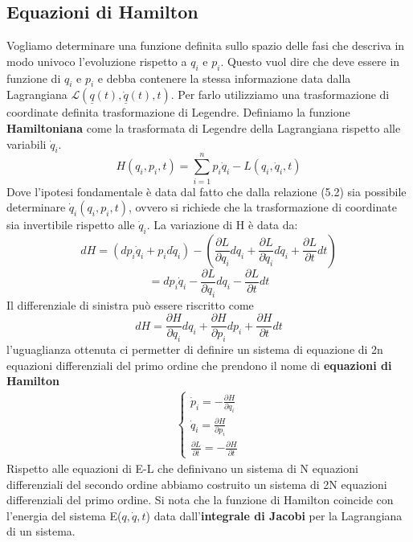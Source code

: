 \subsection{Equazioni di Hamilton}
Vogliamo determinare una funzione definita sullo spazio delle fasi che descriva in modo univoco l'evoluzione rispetto a $q_i$ e $p_i$. Questo vuol dire che deve essere in funzione di $q_i$ e $p_i$ e debba contenere la stessa informazione data dalla Lagrangiana $\mathcal{L}(\underline{q}(t),\underline{\dot q}(t),t)$. Per farlo utilizziamo una trasformazione di coordinate definita trasformazione di Legendre.
Definiamo la funzione \textbf{Hamiltoniana} come la trasformata di Legendre della Lagrangiana rispetto alle variabili $\dot q_i$.
\begin{equation}
	H\left(q_i, p_i, t\right)=\sum_{i=1}^n p_i \dot{q}_i-L\left(q_i, \dot{q}_i, t\right)
\end{equation}
Dove l'ipotesi fondamentale \`{e} data dal fatto che dalla relazione (5.2) sia possibile determinare $\dot q_i(q_i,p_i,t)$, ovvero si richiede che la trasformazione di coordinate sia invertibile rispetto alle $\dot q_i$.\newline
La variazione di H \`{e} data da:
\begin{equation}
	d H=\left(d p_i \dot{q}_i+p_i d \dot{q}_i\right)-\left(\frac{\partial L}{\partial q_i} d q_i+\frac{\partial L}{\partial \dot{q}_i} d \dot{q}_i+\frac{\partial L}{\partial t} d t\right)
\end{equation}
\begin{equation*}
	=d p_i \dot{q}_i-\frac{\partial L}{\partial q_i} d q_i-\frac{\partial L}{\partial t} d t
\end{equation*}
Il differenziale di sinistra pu\`{o} essere riscritto come
\begin{equation}
	d H=\frac{\partial H}{\partial q_i} d q_i+\frac{\partial H}{\partial p_i} d p_i+\frac{\partial H}{\partial t} d t
\end{equation}
l'uguaglianza ottenuta ci permetter di definire un sistema di equazione di 2n equazioni differenziali del primo ordine che prendono il nome di \textbf{equazioni di Hamilton}
\begin{align}
	\begin{cases}
	\dot{p}_i  =-\frac{\partial H}{\partial q_i} \\
	\dot{q}_i  =\frac{\partial H}{\partial p_i} \\
	\frac{\partial L}{\partial t} = -\frac{\partial H}{\partial t}
	\end{cases}	
\end{align}	
Rispetto alle equazioni di E-L che definivano un sistema di N equazioni differenziali del secondo ordine
abbiamo costruito un sistema di 2N equazioni differenziali del primo ordine.\newline
Si nota che la funzione di Hamilton coincide con l'energia del sistema E($q,\dot q, t$) data dall'\textbf{integrale di Jacobi} per la Lagrangiana di un sistema.

